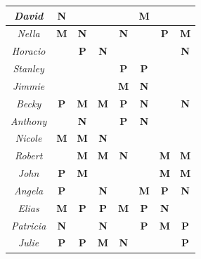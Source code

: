\documentclass[xcolor={dvipsnames, table}]{beamer}
\begin{document}
\begin{frame}[fragile]
\begin{table}[]
{\begin{tabular}{|c|c|c|c|c|c|c|c|}
\textit{David} & {\color[HTML]{3531FF} \textbf{N}} &  &  &  & {\color[HTML]{CB0000} \textbf{M}} &  &  \\ \hline
\textit{Nella} & {\color[HTML]{CB0000} \textbf{M}} & {\color[HTML]{3531FF} \textbf{N}} &  & {\color[HTML]{3531FF} \textbf{N}} &  & {\color[HTML]{009901} \textbf{P}} & {\color[HTML]{CB0000} \textbf{M}} \\ \hline
\textit{Horacio} &  & {\color[HTML]{009901} \textbf{P}} & {\color[HTML]{3531FF} \textbf{N}} &  &  &  & {\color[HTML]{3531FF} \textbf{N}} \\ \hline
\textit{Stanley} &  &  &  & {\color[HTML]{009901} \textbf{P}} & {\color[HTML]{009901} \textbf{P}} &  &  \\ \hline
\textit{Jimmie} &  &  &  & {\color[HTML]{CB0000} \textbf{M}} & {\color[HTML]{3531FF} \textbf{N}} &  &  \\ \hline
\textit{Becky} & {\color[HTML]{009901} \textbf{P}} & {\color[HTML]{CB0000} \textbf{M}} & {\color[HTML]{CB0000} \textbf{M}} & {\color[HTML]{009901} \textbf{P}} & {\color[HTML]{3531FF} \textbf{N}} &  & {\color[HTML]{3531FF} \textbf{N}} \\ \hline
\textit{Anthony} &  & {\color[HTML]{3531FF} \textbf{N}} &  & {\color[HTML]{009901} \textbf{P}} & {\color[HTML]{3531FF} \textbf{N}} &  &  \\ \hline
\textit{Nicole} & {\color[HTML]{CB0000} \textbf{M}} & {\color[HTML]{CB0000} \textbf{M}} & {\color[HTML]{3531FF} \textbf{N}} &  &  &  &  \\ \hline
\textit{Robert} &  & {\color[HTML]{CB0000} \textbf{M}} & {\color[HTML]{CB0000} \textbf{M}} & {\color[HTML]{3531FF} \textbf{N}} &  & {\color[HTML]{CB0000} \textbf{M}} & {\color[HTML]{CB0000} \textbf{M}} \\ \hline
\textit{John} & {\color[HTML]{009901} \textbf{P}} & {\color[HTML]{CB0000} \textbf{M}} &  &  &  & {\color[HTML]{CB0000} \textbf{M}} & {\color[HTML]{CB0000} \textbf{M}} \\ \hline
\textit{Angela} & {\color[HTML]{009901} \textbf{P}} &  & {\color[HTML]{3531FF} \textbf{N}} &  & {\color[HTML]{CB0000} \textbf{M}} & {\color[HTML]{009901} \textbf{P}} & {\color[HTML]{3531FF} \textbf{N}} \\ \hline
\textit{Elias} & {\color[HTML]{CB0000} \textbf{M}} & {\color[HTML]{009901} \textbf{P}} & {\color[HTML]{009901} \textbf{P}} & {\color[HTML]{CB0000} \textbf{M}} & {\color[HTML]{009901} \textbf{P}} & {\color[HTML]{3531FF} \textbf{N}} &  \\ \hline
\textit{Patricia} & {\color[HTML]{3531FF} \textbf{N}} &  & {\color[HTML]{3531FF} \textbf{N}} &  & {\color[HTML]{009901} \textbf{P}} & {\color[HTML]{CB0000} \textbf{M}} & {\color[HTML]{009901} \textbf{P}} \\ \hline
\textit{Julie} & {\color[HTML]{009901} \textbf{P}} & {\color[HTML]{009901} \textbf{P}} & {\color[HTML]{CB0000} \textbf{M}} & {\color[HTML]{3531FF} \textbf{N}} &  &  & {\color[HTML]{009901} \textbf{P}} \\ \hline
\end{tabular}%
}
\end{table}
\end{frame}
\end{document}
